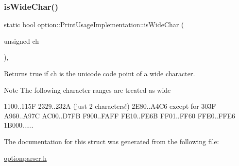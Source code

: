 \subsubsection{\texorpdfstring{is\+Wide\+Char()}{isWideChar()}}
{\footnotesize\ttfamily static bool option\+::\+Print\+Usage\+Implementation\+::is\+Wide\+Char (\begin{DoxyParamCaption}\item[{unsigned}]{ch }\end{DoxyParamCaption})\hspace{0.3cm}{\ttfamily [inline]}, {\ttfamily [static]}}



Returns true if ch is the unicode code point of a wide character. 

\begin{DoxyNote}{Note}
The following character ranges are treated as wide 
\begin{DoxyCode}
1100..115F
2329..232A  (just 2 characters!)
2E80..A4C6  except \textcolor{keywordflow}{for} 303F
A960..A97C
AC00..D7FB
F900..FAFF
FE10..FE6B
FF01..FF60
FFE0..FFE6
1B000......
\end{DoxyCode}
 
\end{DoxyNote}


The documentation for this struct was generated from the following file\+:\begin{DoxyCompactItemize}
\item 
\hyperlink{optionparser_8h}{optionparser.\+h}\end{DoxyCompactItemize}

